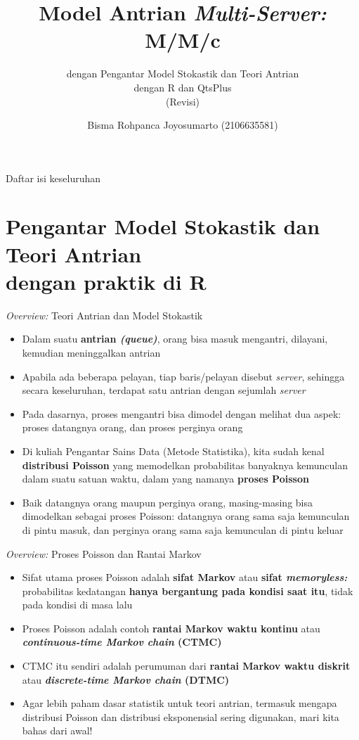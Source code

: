 \documentclass{beamer}
\title{Model Antrian \textit{Multi-Server:} M/M/c}
\subtitle{dengan Pengantar Model Stokastik dan Teori Antrian \\ dengan R dan QtsPlus \\ (Revisi)}
\author{Bisma Rohpanca Joyosumarto (2106635581)}
\institute{Departemen Matematika FMIPA UI \\ Universitas Indonesia}
\date{
    November 2024

    Riset Operasi
    
    Tahun Ajaran 2024/2025 Semester Ganjil
}
\begin{document}
\frame{\titlepage}

\begin{frame}{Daftar isi keseluruhan}
    \tableofcontents
\end{frame}

\section[Pengantar Model Stokastik dan Teori Antrian. dengan praktik di R]{Pengantar Model Stokastik dan Teori Antrian \\ dengan praktik di R}

\begin{frame}{\textit{Overview:} Teori Antrian dan Model Stokastik}
    \begin{itemize}
        \item Dalam suatu \textbf{antrian \textit{(queue)}}, orang bisa masuk mengantri, dilayani, kemudian meninggalkan antrian
        \item Apabila ada beberapa pelayan, tiap baris/pelayan disebut \textit{server}, sehingga secara keseluruhan, terdapat satu antrian dengan sejumlah \textit{server}
        \item Pada dasarnya, proses mengantri bisa dimodel dengan melihat dua aspek: proses datangnya orang, dan proses perginya orang
        \item Di kuliah Pengantar Sains Data (Metode Statistika), kita sudah kenal \textbf{distribusi Poisson} yang memodelkan probabilitas banyaknya kemunculan dalam suatu satuan waktu, dalam yang namanya \textbf{proses Poisson}
        \item Baik datangnya orang maupun perginya orang, masing-masing bisa dimodelkan sebagai proses Poisson: datangnya orang sama saja kemunculan di pintu masuk, dan perginya orang sama saja kemunculan di pintu keluar
    \end{itemize}
\end{frame}

\begin{frame}{\textit{Overview:} Proses Poisson dan Rantai Markov}
    \begin{itemize}
        \item Sifat utama proses Poisson adalah \textbf{sifat Markov} atau \textbf{sifat \textit{memoryless:}} probabilitas kedatangan \textbf{hanya bergantung pada kondisi saat itu}, tidak pada kondisi di masa lalu
        \item Proses Poisson adalah contoh \textbf{rantai Markov waktu kontinu} atau \textbf{\textit{continuous-time Markov chain} (CTMC)}
        \item CTMC itu sendiri adalah perumuman dari \textbf{rantai Markov waktu diskrit} atau \textbf{\textit{discrete-time Markov chain} (DTMC)}
        \item Agar lebih paham dasar statistik untuk teori antrian, termasuk mengapa distribusi Poisson dan distribusi eksponensial sering digunakan, mari kita bahas dari awal!
    \end{itemize}
\end{frame}
\end{document}
